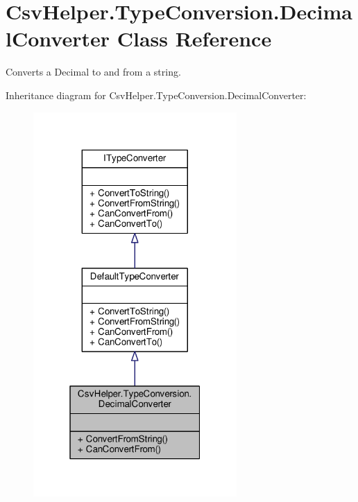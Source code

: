 \hypertarget{a00084}{\section{Csv\-Helper.\-Type\-Conversion.\-Decimal\-Converter Class Reference}
\label{a00084}
}


Converts a Decimal to and from a string.  




Inheritance diagram for Csv\-Helper.\-Type\-Conversion.\-Decimal\-Converter\-:
\nopagebreak
\begin{figure}[H]
\begin{center}
\leavevmode
\includegraphics[width=220pt]{a00501}
\end{center}
\end{figure}


